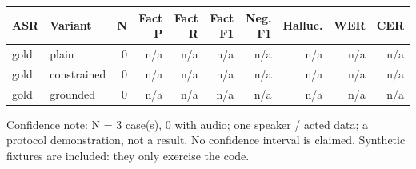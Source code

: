 \begin{tabular}{llrrrrrrrr}
\hline
\textbf{ASR} & \textbf{Variant} & \textbf{N} & \textbf{Fact P} & \textbf{Fact R} & \textbf{Fact F1} & \textbf{Neg. F1} & \textbf{Halluc.} & \textbf{WER} & \textbf{CER} \\
\hline
gold & plain & 0 & n/a & n/a & n/a & n/a & n/a & n/a & n/a \\
gold & constrained & 0 & n/a & n/a & n/a & n/a & n/a & n/a & n/a \\
gold & grounded & 0 & n/a & n/a & n/a & n/a & n/a & n/a & n/a \\
\hline
\end{tabular}

\par\footnotesize Confidence note: N = 3 case(s), 0 with audio; one speaker / acted data; a protocol demonstration, not a result. No confidence interval is claimed. Synthetic fixtures are included: they only exercise the code.
